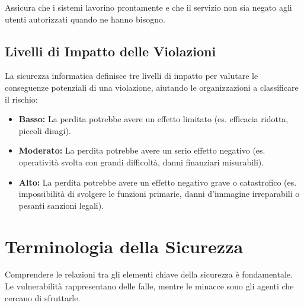\begin{defbox}
Assicura che i sistemi lavorino prontamente e che il servizio non sia negato agli utenti autorizzati quando ne hanno bisogno.
\end{defbox}

\subsection{Livelli di Impatto delle Violazioni}

La sicurezza informatica definisce tre livelli di impatto per valutare le conseguenze potenziali di una violazione, aiutando le organizzazioni a classificare il rischio:

\begin{itemize}
    \item \textbf{Basso:} La perdita potrebbe avere un effetto limitato (es. efficacia ridotta, piccoli disagi).
    \item \textbf{Moderato:} La perdita potrebbe avere un serio effetto negativo (es. operatività svolta con grandi difficoltà, danni finanziari misurabili).
    \item \textbf{Alto:} La perdita potrebbe avere un effetto negativo grave o catastrofico (es. impossibilità di svolgere le funzioni primarie, danni d'immagine irreparabili o pesanti sanzioni legali).
\end{itemize}


\section{Terminologia della Sicurezza}
Comprendere le relazioni tra gli elementi chiave della sicurezza è fondamentale. Le vulnerabilità rappresentano delle falle, mentre le minacce sono gli agenti che cercano di sfruttarle.

